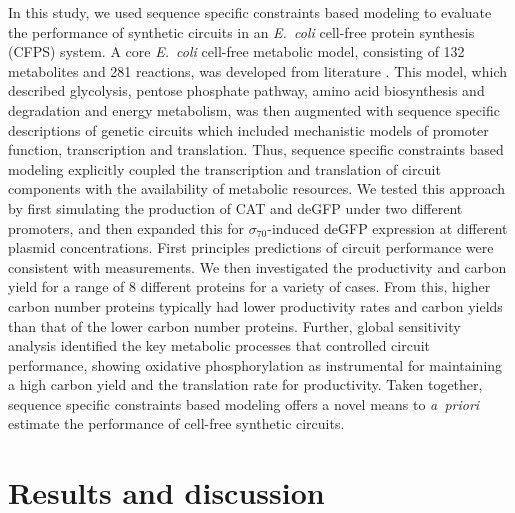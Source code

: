 \documentclass[journal=asbcd6,manuscript=article]{achemso}
\begin{document}
In this study, we used sequence specific constraints based modeling to evaluate the performance of synthetic circuits in an \emph{E.~coli} cell-free protein synthesis (CFPS) system.
A core \emph{E.~coli} cell-free metabolic model, consisting of 132 metabolites and 281 reactions, was developed from literature \cite{Feist:2007aa}.
This model, which described glycolysis, pentose phosphate pathway, amino acid biosynthesis and degradation and energy metabolism, was then augmented with
sequence specific descriptions of genetic circuits which included mechanistic models of promoter function, transcription and translation.
Thus, sequence specific constraints based modeling explicitly coupled the transcription and translation of circuit components with the availability of metabolic resources.
We tested this approach by first simulating the production of CAT and deGFP under two different promoters, and then expanded this for $\sigma_{70}$-induced deGFP expression at different plasmid concentrations.
First principles predictions of circuit performance were consistent with measurements.
We then investigated the productivity and carbon yield for a range of 8 different proteins for a variety of cases.
From this, higher carbon number proteins typically had lower productivity rates and carbon yields than that of the lower carbon number proteins.
Further, global sensitivity analysis identified the key metabolic processes that controlled circuit performance, showing oxidative phosphorylation as instrumental for maintaining a high carbon yield and the translation rate for productivity.
Taken together, sequence specific constraints based modeling offers a novel means to \emph{a~priori} estimate the performance of cell-free synthetic circuits.

\section{Results and discussion}
\end{document}
